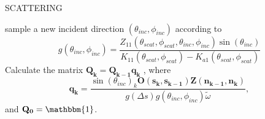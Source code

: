\begin{minipage}{8cm}
\begin{sf}
SCATTERING

sample a new incident direction
  $(\theta_{inc},\phi_{inc})$ according to 
\[
g(\theta_{inc},\phi_{inc})=\frac{Z_{11}(\theta_{scat},\phi_{scat},
\theta_{inc},\phi_{inc})\sin(\theta_{inc})}{K_{11}(\theta_{scat},\phi_{scat})
  - K_{a1}(\theta_{scat},\phi_{scat})}
\]
Calculate the matrix $\mathbf{Q_k}=\mathbf{Q_{k-1}q_k}$
, where
\[
\mathbf{q_k}=\frac{\sin(\theta_{inc})_k
  \mathbf{O(s_k,s_{k-1})}\mathbf{Z(n_{k-1},n_k)}}
  {g\left(\Delta s\right)g(\theta_{inc},\phi_{inc}) \tilde{\omega}} ,
\]
and $\mathbf{Q_0}=\mathbbm{1}$.
\end{sf}
\end{minipage}